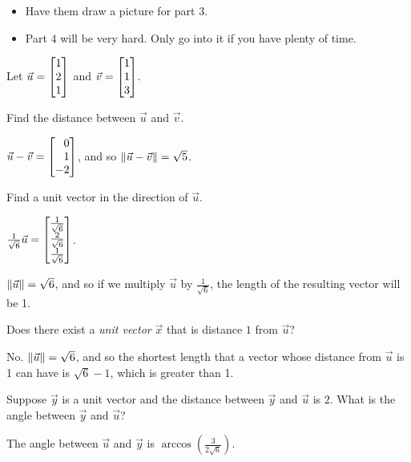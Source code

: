\documentclass{workbook}
\begin{document}
\begin{slide}
\begin{annotation}
\begin{notes}
\begin{itemize}
					They will forget that $\sqrt{k^2}=\abs{k}$ and so there are two solutions
					unless you insist on $k\geq 0$. You could mention ``in the direction of'' vs. the
					more specific ``in the positive direction of'' if you want to have a detailed discussion.
				\item Have them draw a picture for part 3.
				\item Part 4 will be very hard. Only go into it if you have plenty of time.
			\end{itemize}
		\end{notes}
	\end{annotation}
	Let $\vec u=\mat{1\\2\\1}$ and $\vec v=\mat{1\\1\\3}$.
	\begin{parts}
		\item Find the distance between $\vec u$ and $\vec v$.
			\begin{solution}
				$\vec u - \vec v = \mat{0\\1\\-2}$, and so $\lVert\vec u-\vec v\rVert = \sqrt{5}$.
			\end{solution}
		\item Find a unit vector in the direction of $\vec u$.
			\begin{solution}
				$\frac{1}{\sqrt{6}} \vec u = \mat{\frac{1}{\sqrt{6}}\\\frac{2}{\sqrt{6}}\\\frac{1}{\sqrt{6}}}$.

				$\lVert\vec u\rVert = \sqrt{6}$, and so if we multiply $\vec u$ by $\frac{1}{\sqrt{6}}$,
				the length of the resulting vector will be 1.
			\end{solution}
		\item Does there exist a \emph{unit vector} $\vec x$ that is distance
			$1$ from $\vec u$?
			\begin{solution}
				No. $\lVert\vec u\rVert = \sqrt{6}$, and so the shortest length that a
				vector whose distance from $\vec u$ is 1 can have is $\sqrt{6} - 1$,
				which is greater than 1.
			\end{solution}
		\item Suppose $\vec y$ is a unit vector and the distance between $\vec y$
			and	$\vec u$ is $2$. What is the angle between $\vec y$ and $\vec u$?
			\begin{solution}
				The angle between $\vec u$ and $\vec y$ is $\arccos\left(\frac{3}{2\sqrt{6}}\right)$.


\end{solution}
\end{parts}
\end{slide}
\end{document}
